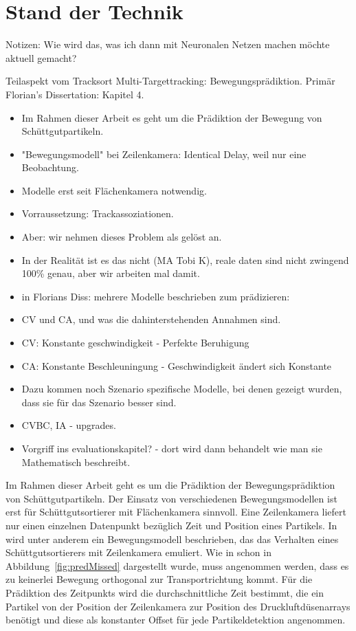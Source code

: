 \section{Stand der Technik}

Notizen:
\color{blue}
Wie wird das, was ich dann mit Neuronalen Netzen machen möchte aktuell gemacht?


Teilaspekt vom Tracksort Multi-Targettracking: Bewegungsprädiktion.
Primär Florian's Dissertation: Kapitel 4.


\begin{itemize}
    \item Im Rahmen dieser Arbeit es geht um die Prädiktion der Bewegung von Schüttgutpartikeln.
    \item "Bewegungsmodell" bei Zeilenkamera: Identical Delay, weil nur eine Beobachtung.
    \item Modelle erst seit Flächenkamera notwendig.
    \item Vorraussetzung: Trackassoziationen.
    \item Aber: wir nehmen dieses Problem als gelöst an.
    \item In der Realität ist es das nicht (MA Tobi K), reale daten sind nicht zwingend 100\% genau, aber wir arbeiten mal damit.
    \item in Florians Diss: mehrere Modelle beschrieben zum prädizieren:
    \item CV und CA, und was die dahinterstehenden Annahmen sind.
    \item CV: Konstante geschwindigkeit - Perfekte Beruhigung
    \item CA: Konstante Beschleuningung - Geschwindigkeit ändert sich Konstante
    \item Dazu kommen noch Szenario spezifische Modelle, bei denen gezeigt wurden, dass sie für das Szenario besser sind.
    \item CVBC, IA - upgrades.
    \item Vorgriff ins evaluationskapitel? - dort wird dann behandelt wie man sie Mathematisch beschreibt. 
\end{itemize}

\color{black}


Im Rahmen dieser Arbeit geht es um die Prädiktion der Bewegungsprädiktion von Schüttgutpartikeln.
Der Einsatz von verschiedenen Bewegungsmodellen ist erst für Schüttgutsortierer mit Flächenkamera sinnvoll.
Eine Zeilenkamera liefert nur einen einzelnen Datenpunkt bezüglich Zeit und Position eines Partikels.
In~\cite{Pfaff2018} wird unter anderem ein Bewegungsmodell beschrieben, das das Verhalten eines Schüttgutsortierers mit Zeilenkamera emuliert.
Wie in schon in Abbildung~\ref{fig:predMissed} dargestellt wurde, muss angenommen werden, dass es zu keinerlei Bewegung orthogonal zur Transportrichtung kommt.
Für die Prädiktion des Zeitpunkts wird die durchschnittliche Zeit bestimmt, die ein Partikel von der Position der Zeilenkamera zur Position des Druckluftdüsenarrays benötigt 
und diese als konstanter Offset für jede Partikeldetektion angenommen.

